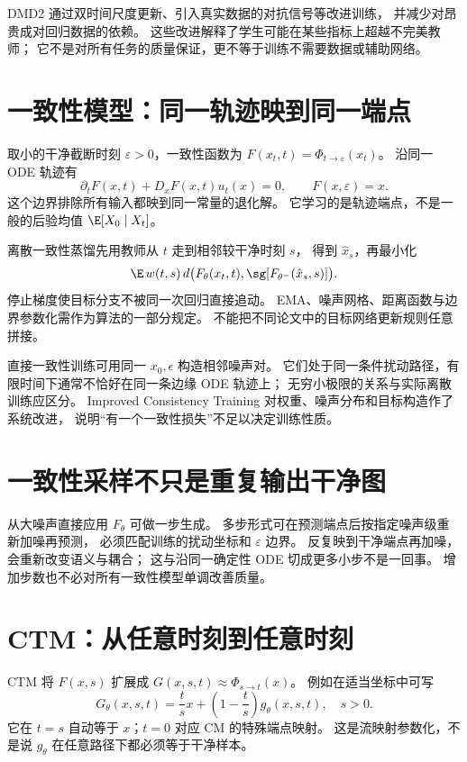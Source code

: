 DMD2 通过双时间尺度更新、引入真实数据的对抗信号等改进训练，
并减少对昂贵成对回归数据的依赖。
这些改进解释了学生可能在某些指标上超越不完美教师；
它不是对所有任务的质量保证，更不等于训练不需要数据或辅助网络。

\section{一致性模型：同一轨迹映到同一端点}

取小的干净截断时刻 $\varepsilon>0$，一致性函数为
$F(x_t,t)=\Phi_{t\to\varepsilon}(x_t)$。
沿同一 ODE 轨迹有
\begin{equation}\label{th:cm-pde}
\partial_tF(x,t)+D_xF(x,t)u_t(x)=0,
\qquad F(x,\varepsilon)=x.
\end{equation}
这个边界排除所有输入都映到同一常量的退化解。
它学习的是轨迹端点，不是一般的后验均值 $\E[X_0\mid X_t]$。

离散一致性蒸馏先用教师从 $t$ 走到相邻较干净时刻 $s$，
得到 $\hat x_s$，再最小化
\[
\E\,w(t,s)\,d\big(F_\theta(x_t,t),
 \sg[F_{\theta^-}(\hat x_s,s)]\big).
\]
停止梯度使目标分支不被同一次回归直接追动。
EMA、噪声网格、距离函数与边界参数化需作为算法的一部分规定。
不能把不同论文中的目标网络更新规则任意拼接。

直接一致性训练可用同一 $x_0,\epsilon$ 构造相邻噪声对。
它们处于同一条件扰动路径，有限时间下通常不恰好在同一条边缘 ODE 轨迹上；
无穷小极限的关系与实际离散训练应区分。
Improved Consistency Training 对权重、噪声分布和目标构造作了系统改进，
说明“有一个一致性损失”不足以决定训练性质。

\section{一致性采样不只是重复输出干净图}

从大噪声直接应用 $F_\theta$ 可做一步生成。
多步形式可在预测端点后按指定噪声级重新加噪再预测，
必须匹配训练的扰动坐标和 $\varepsilon$ 边界。
反复映到干净端点再加噪，会重新改变语义与耦合；
这与沿同一确定性 ODE 切成更多小步不是一回事。
增加步数也不必对所有一致性模型单调改善质量。

\section{CTM：从任意时刻到任意时刻}

CTM 将 $F(x,s)$ 扩展成 $G(x,s,t)\approx\Phi_{s\to t}(x)$。
例如在适当坐标中可写
\[
G_\theta(x,s,t)=\frac ts x+\left(1-\frac ts\right)g_\theta(x,s,t),\quad s>0.
\]
它在 $t=s$ 自动等于 $x$；$t=0$ 对应 CM 的特殊端点映射。
这是流映射参数化，不是说 $g_\theta$ 在任意路径下都必须等于干净样本。

